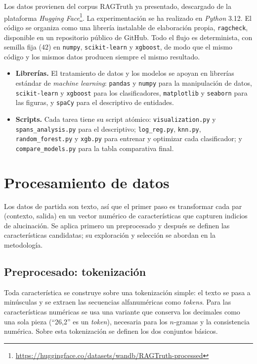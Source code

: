 \documentclass[12pt,a4paper]{report}
\theoremstyle{definition}
\newcommand{\tc}[1]{\texttt{#1}}
\begin{document}
Los datos provienen del corpus RAGTruth ya presentado, descargado de la plataforma \emph{Hugging
Face}\footnote{\url{https://huggingface.co/datasets/wandb/RAGTruth-processed}}. La experimentación se
ha realizado en \emph{Python} 3.12. El código se organiza como una librería instalable de elaboración
propia, \tc{ragcheck}, disponible en un repositorio público de GitHub. Todo el flujo es determinista,
con semilla fija ($42$) en \tc{numpy}, \tc{scikit-learn} y \tc{xgboost}, de modo que el mismo código y
los mismos datos producen siempre el mismo resultado.

\begin{itemize}
\item \textbf{Librerías.} El tratamiento de datos y los modelos se apoyan en librerías estándar de
\emph{machine learning}: \tc{pandas} y \tc{numpy} para la manipulación de datos, \tc{scikit-learn} y
\tc{xgboost} para los clasificadores, \tc{matplotlib} y \tc{seaborn} para las figuras, y \tc{spaCy}
para el descriptivo de entidades.
\item \textbf{Scripts.} Cada tarea tiene su script atómico: \tc{visualization.py} y
\tc{spans\_analysis.py} para el descriptivo; \tc{log\_reg.py}, \tc{knn.py},
\tc{random\_forest.py} y \tc{xgb.py} para entrenar y optimizar cada clasificador; y
\tc{compare\_models.py} para la tabla comparativa final.
\end{itemize}

\section{Procesamiento de datos}
\label{sec:fe}

Los datos de partida son texto, así que el primer paso es transformar cada par (contexto, salida) en
un vector numérico de características que capturen indicios de alucinación. Se aplica primero un
preprocesado y después se definen las características candidatas; su exploración y selección se abordan
en la metodología.

\subsection{Preprocesado: tokenización}

Toda característica se construye sobre una tokenización simple: el texto se pasa a
minúsculas y se extraen las secuencias alfanuméricas como \emph{tokens}. Para las
características numéricas se usa una variante que conserva los decimales como una sola pieza
(``26,2'' es un \emph{token}), necesaria para los $n$-gramas y la consistencia numérica. Sobre
esta tokenización se definen los dos conjuntos básicos.
\end{document}
